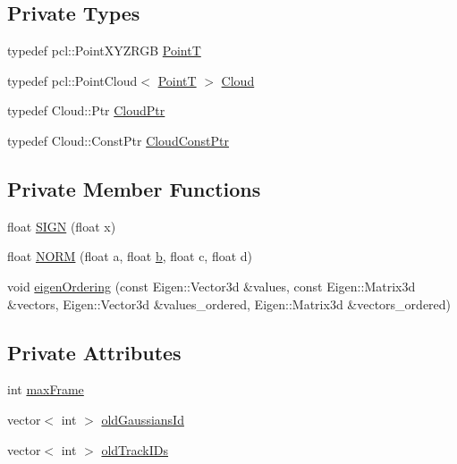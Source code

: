 \subsection*{\-Private \-Types}
\begin{DoxyCompactItemize}
\item 
typedef pcl\-::\-Point\-X\-Y\-Z\-R\-G\-B \hyperlink{class_p_c_track_container_a37571d1fb0e896825033974c21a59ada}{\-Point\-T}
\item 
typedef pcl\-::\-Point\-Cloud$<$ \hyperlink{class_p_c_track_container_a37571d1fb0e896825033974c21a59ada}{\-Point\-T} $>$ \hyperlink{class_p_c_track_container_ad70a8e8d9236664790fd8d76a2ebeadb}{\-Cloud}
\item 
typedef \-Cloud\-::\-Ptr \hyperlink{class_p_c_track_container_a6e14769099ac04f16c881162f9397f56}{\-Cloud\-Ptr}
\item 
typedef \-Cloud\-::\-Const\-Ptr \hyperlink{class_p_c_track_container_a14e4333a2498a4a5728e888fc473b129}{\-Cloud\-Const\-Ptr}
\end{DoxyCompactItemize}
\subsection*{\-Private \-Member \-Functions}
\begin{DoxyCompactItemize}
\item 
float \hyperlink{class_p_c_track_container_a048f09bbd1d6c1655e1d58a113e86b1d}{\-S\-I\-G\-N} (float x)
\item 
float \hyperlink{class_p_c_track_container_ab722f94e8a660331d1c987a91af50179}{\-N\-O\-R\-M} (float a, float \hyperlink{class_track_container_a090d3d6e83acad80cad082cd718a4ab3}{b}, float c, float d)
\item 
void \hyperlink{class_p_c_track_container_a5d2ad9da112f92800e67d2da8f1ac531}{eigen\-Ordering} (const \-Eigen\-::\-Vector3d \&values, const \-Eigen\-::\-Matrix3d \&vectors, \-Eigen\-::\-Vector3d \&values\-\_\-ordered, \-Eigen\-::\-Matrix3d \&vectors\-\_\-ordered)
\end{DoxyCompactItemize}
\subsection*{\-Private \-Attributes}
\begin{DoxyCompactItemize}
\item 
int \hyperlink{class_p_c_track_container_afa0c55015d7b49548fa196d3091dacba}{max\-Frame}
\item 
vector$<$ int $>$ \hyperlink{class_p_c_track_container_a3bc617cd354340024249e246b9843a67}{old\-Gaussians\-Id}
\item 
vector$<$ int $>$ \hyperlink{class_p_c_track_container_ad2a1026f52411833d07d1fbf741e7cd5}{old\-Track\-I\-Ds}
\end{DoxyCompactItemize}


